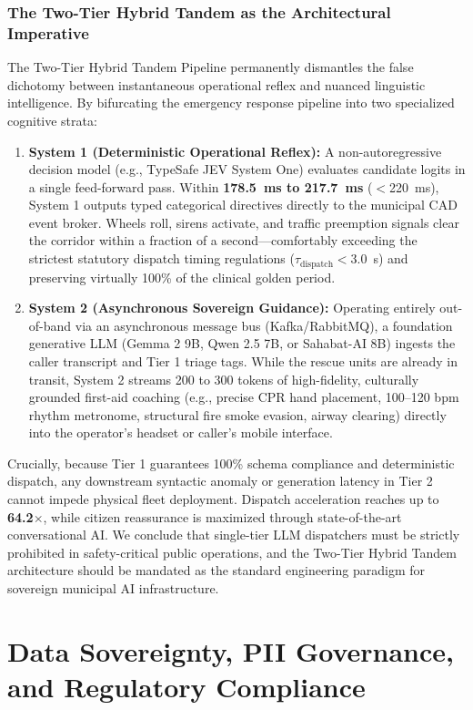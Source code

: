 \documentclass[journal,compsoc]{IEEEtran}
\begin{document}
\subsubsection{The Two-Tier Hybrid Tandem as the Architectural Imperative}
The Two-Tier Hybrid Tandem Pipeline permanently dismantles the false dichotomy between instantaneous operational reflex and nuanced linguistic intelligence. By bifurcating the emergency response pipeline into two specialized cognitive strata:
\begin{enumerate}
    \item \textbf{System 1 (Deterministic Operational Reflex):} A non-autoregressive decision model (e.g., TypeSafe JEV System One) evaluates candidate logits in a single feed-forward pass. Within \textbf{178.5~ms to 217.7~ms} ($<$220~ms), System 1 outputs typed categorical directives directly to the municipal CAD event broker. Wheels roll, sirens activate, and traffic preemption signals clear the corridor within a fraction of a second—comfortably exceeding the strictest statutory dispatch timing regulations ($\tau_{\text{dispatch}} < 3.0$~s) and preserving virtually 100\% of the clinical golden period.
    \item \textbf{System 2 (Asynchronous Sovereign Guidance):} Operating entirely out-of-band via an asynchronous message bus (Kafka/RabbitMQ), a foundation generative LLM (Gemma 2 9B, Qwen 2.5 7B, or Sahabat-AI 8B) ingests the caller transcript and Tier 1 triage tags. While the rescue units are already in transit, System 2 streams 200 to 300 tokens of high-fidelity, culturally grounded first-aid coaching (e.g., precise CPR hand placement, 100--120 bpm rhythm metronome, structural fire smoke evasion, airway clearing) directly into the operator's headset or caller's mobile interface.
\end{enumerate}

Crucially, because Tier 1 guarantees 100\% schema compliance and deterministic dispatch, any downstream syntactic anomaly or generation latency in Tier 2 cannot impede physical fleet deployment. Dispatch acceleration reaches up to \textbf{64.2$\times$}, while citizen reassurance is maximized through state-of-the-art conversational AI. We conclude that single-tier LLM dispatchers must be strictly prohibited in safety-critical public operations, and the Two-Tier Hybrid Tandem architecture should be mandated as the standard engineering paradigm for sovereign municipal AI infrastructure.

\section{Data Sovereignty, PII Governance, and Regulatory Compliance}
\end{document}

